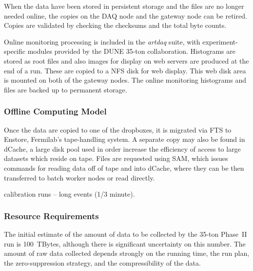 When the data have been stored in persistent storage and the files are no longer needed online,
the copies on the DAQ node and the gateway node can be retired.  Copies are validated by checking
the checksums and the total byte counts.

Online monitoring processing is included in the {\it artdaq} suite, with experiment-specific modules
provided by the DUNE 35-ton collaboration.  Histograms are stored as root files and also
images for display on web servers are produced at the end of a run.  These are copied to a NFS disk
for web display.  This web disk area is mounted on both of the gateway nodes.  The online
monitoring histograms and files are backed up to permanent storage.

\subsubsection{Offline Computing Model}

Once the data are copied to one of the dropboxes, it is migrated via FTS to Enstore, Fermilab's tape-handling
system.  A separate copy may also be found in dCache, a large disk pool used in order increase the
efficiency of access to large datasets which reside on tape.  Files are requested using SAM, which
issues commands for reading data off of tape and into dCache, where they can be then transferred
to batch worker nodes or read directly.  

calibration runs -- long events (1/3 minute).

\subsubsection{Resource Requirements}

The initial estimate of the amount of data to be collected by the 35-ton Phase~II run is 100~TBytes,
although there is significant uncertainty on this number.  The amount of raw data collected
depends strongly on the running time, the run plan, the zero-suppression strategy, and the
compressibility of the data.
